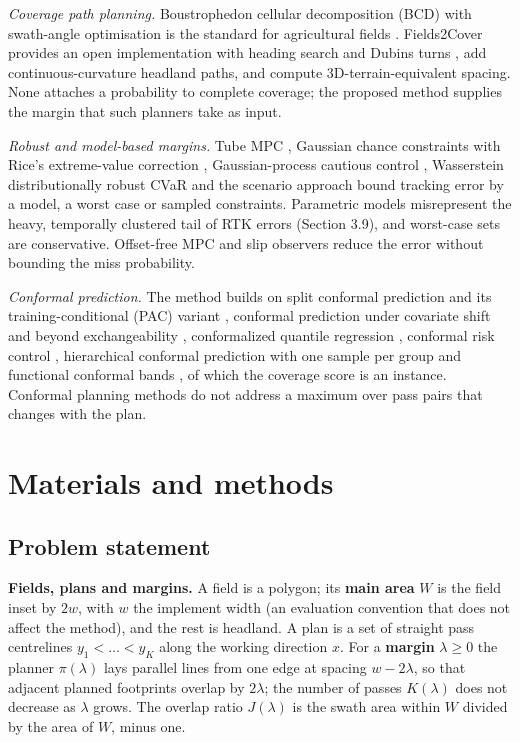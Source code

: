\documentclass[preprint,12pt,authoryear]{elsarticle}
\begin{document}
\emph{Coverage path planning.} Boustrophedon cellular decomposition (BCD) with swath-angle optimisation is the standard for agricultural fields \citep{hoffmann2024}. Fields2Cover provides an open implementation with heading search and Dubins turns \citep{mier2023}, \citet{mier2025} add continuous-curvature headland paths, and \citet{hameed2016} compute 3D-terrain-equivalent spacing. None attaches a probability to complete coverage; the proposed method supplies the margin that such planners take as input.

\emph{Robust and model-based margins.} Tube MPC \citep{mayne2005}, Gaussian chance constraints with Rice's extreme-value correction \citep{rice1944}, Gaussian-process cautious control \citep{hewing2020}, Wasserstein distributionally robust CVaR \citep{mohajerin2018} and the scenario approach \citep{campi2008} bound tracking error by a model, a worst case or sampled constraints. Parametric models misrepresent the heavy, temporally clustered tail of RTK errors (Section 3.9), and worst-case sets are conservative. Offset-free MPC \citep{pannocchia2003} and slip observers \citep{lenain2006} reduce the error without bounding the miss probability.

\emph{Conformal prediction.} The method builds on split conformal prediction and its training-conditional (PAC) variant \citep{vovk2012}, conformal prediction under covariate shift and beyond exchangeability \citep{tibshirani2019,barber2023}, conformalized quantile regression \citep[CQR;][]{romano2019}, conformal risk control \citep{angelopoulos2024crc,angelopoulos2025ltt}, hierarchical conformal prediction with one sample per group \citep{dunn2023} and functional conformal bands \citep{lei2015,diquigiovanni2022}, of which the coverage score is an instance. Conformal planning methods \citep{lindemann2023,zhao2024,sun2023,wang2025} do not address a maximum over pass pairs that changes with the plan.

\section{Materials and methods}

\subsection{Problem statement}

\textbf{Fields, plans and margins.} A field is a polygon; its \textbf{main area} \(W\) is the field inset by \(2w\), with \(w\) the implement width (an evaluation convention that does not affect the method), and the rest is headland. A plan is a set of straight pass centrelines \(y_1<\dots<y_K\) along the working direction \(x\). For a \textbf{margin} \(\lambda\ge0\) the planner \(\pi(\lambda)\) lays parallel lines from one edge at spacing \(w-2\lambda\), so that adjacent planned footprints overlap by \(2\lambda\); the number of passes \(K(\lambda)\) does not decrease as \(\lambda\) grows. The overlap ratio \(J(\lambda)\) is the swath area within \(W\) divided by the area of \(W\), minus one.
\end{document}
